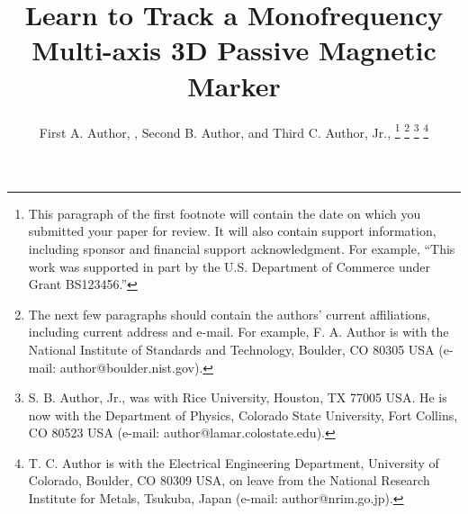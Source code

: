 \documentclass[journal,twoside,web]{ieeecolor}
\begin{document}
\title{Learn to Track a Monofrequency Multi-axis 3D Passive Magnetic Marker}
\author{First A. Author, , Second B. Author, and Third C. Author, Jr., 
\thanks{This paragraph of the first footnote will contain the date on 
which you submitted your paper for review. It will also contain support 
information, including sponsor and financial support acknowledgment. For 
example, ``This work was supported in part by the U.S. Department of 
Commerce under Grant BS123456.'' }
\thanks{The next few paragraphs should contain 
the authors' current affiliations, including current address and e-mail. For 
example, F. A. Author is with the National Institute of Standards and 
Technology, Boulder, CO 80305 USA (e-mail: author@boulder.nist.gov). }
\thanks{S. B. Author, Jr., was with Rice University, Houston, TX 77005 USA. He is 
now with the Department of Physics, Colorado State University, Fort Collins, 
CO 80523 USA (e-mail: author@lamar.colostate.edu).}
\thanks{T. C. Author is with 
the Electrical Engineering Department, University of Colorado, Boulder, CO 
80309 USA, on leave from the National Research Institute for Metals, 
Tsukuba, Japan (e-mail: author@nrim.go.jp).}}
\end{document}
